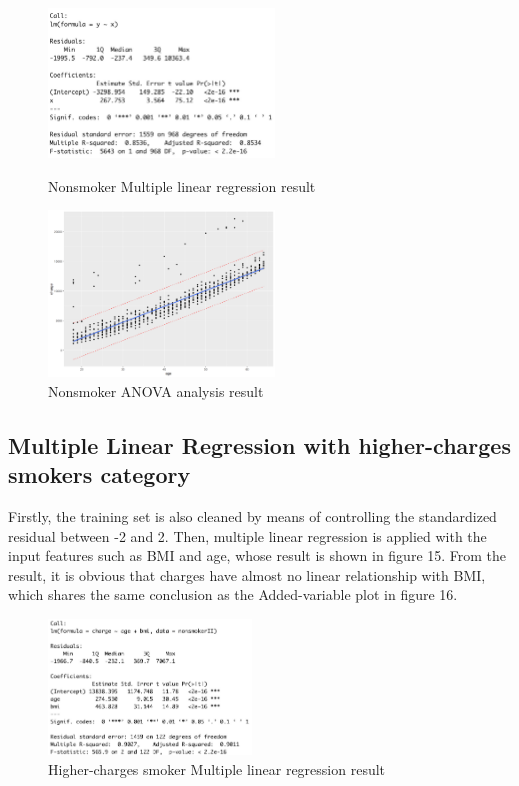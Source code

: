 \documentclass[12pt,a4paper]{article}
\begin{document}
\begin{figure}[H]
\centering
\begin{minipage}[t]{0.48\textwidth}
\centering
\includegraphics[width=6cm]{simple linear model.jpg}
\caption{Nonsmoker Multiple linear regression result}
\end{minipage}
\begin{minipage}[t]{0.48\textwidth}
\centering
\includegraphics[width=6cm]{non_smoker.png}
\caption{Nonsmoker ANOVA analysis result}
\end{minipage}
\end{figure}

\subsection{Multiple Linear Regression with higher-charges smokers category }
Firstly, the training set is also cleaned by means of controlling the standardized residual between -2 and 2.
Then, multiple linear regression is applied with the input features such as BMI and age, whose result is shown in figure 15. From the result, it is obvious that charges have almost no linear relationship with BMI, which shares the same conclusion as the Added-variable plot in figure 16. 
\begin{figure}[H]
\centering
\includegraphics[width=0.48\textwidth]{mlm2.jpg}
\caption{Higher-charges smoker Multiple linear regression result}
\end{figure}
\end{document}
